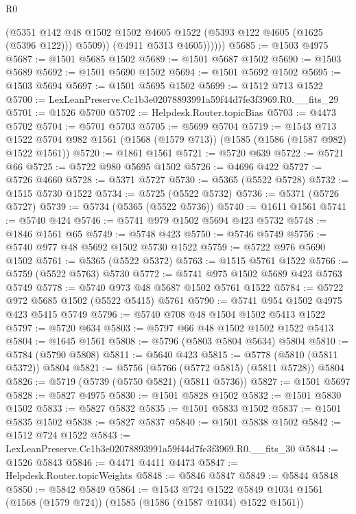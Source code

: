 \begin{lexlean}{R0}
\begin{coremodule}
                (@5351
                  @142
                  @48
                  @1502
                  @1502
                  @4605
                  @1522
                  (@5393 @122 @4605 (@1625 (@5396 @122)))
                  @5509))
              (@4911 @5313 @4605))))))
@5685 := @1503 @4975
@5687 := @1501 @5685 @1502
@5689 := @1501 @5687 @1502
@5690 := @1503 @5689
@5692 := @1501 @5690 @1502
@5694 := @1501 @5692 @1502
@5695 := @1503 @5694
@5697 := @1501 @5695 @1502
@5699 := @1512 @713 @1522
@5700 := LexLeanPreserve.Cc1b3e02078893991a59f44d7fe3f3969.R0.__fits_29
@5701 := @1526 @5700
@5702 := Helpdesk.Router.topicBias
@5703 := @4473 @5702
@5704 := @5701 @5703
@5705 := @5699 @5704
@5719 := @1543
    @713
    @1522
    @5704
    @982
    @1561
    (@1568 (@1579 @713))
    (@1585 (@1586 (@1587 @982) @1522 @1561))
@5720 := @1861 @1561
@5721 := @5720 @639
@5722 := @5721 @66
@5725 := @5722 @980 @5695 @1502
@5726 := @4696 @422
@5727 := @5726 @4660
@5728 := @5371 @5727
@5730 := @5365 (@5522 @5728)
@5732 := @1515 @5730 @1522
@5734 := @5725 (@5522 @5732)
@5736 := @5371 (@5726 @5727)
@5739 := @5734 (@5365 (@5522 @5736))
@5740 := @1611 @1561
@5741 := @5740 @424
@5746 := @5741 @979 @1502 @5694 @423 @5732
@5748 := @1846 @1561 @65
@5749 := @5748 @423
@5750 := @5746 @5749
@5756 := @5740 @977 @48 @5692 @1502 @5730 @1522
@5759 := @5722 @976 @5690 @1502
@5761 := @5365 (@5522 @5372)
@5763 := @1515 @5761 @1522
@5766 := @5759 (@5522 @5763) @5730
@5772 := @5741 @975 @1502 @5689 @423 @5763 @5749
@5778 := @5740 @973 @48 @5687 @1502 @5761 @1522
@5784 := @5722 @972 @5685 @1502 (@5522 @5415) @5761
@5790 := @5741 @954 @1502 @4975 @423 @5415 @5749
@5796 := @5740 @708 @48 @1504 @1502 @5413 @1522
@5797 := @5720 @634
@5803 := @5797 @66 @48 @1502 @1502 @1522 @5413
@5804 := @1645 @1561
@5808 := @5796 (@5803 @5804 @5634) @5804
@5810 := @5784 (@5790 @5808)
@5811 := @5640 @423
@5815 := @5778 (@5810 (@5811 @5372)) @5804
@5821 := @5756 (@5766 (@5772 @5815) (@5811 @5728)) @5804
@5826 := @5719 (@5739 (@5750 @5821) (@5811 @5736))
@5827 := @1501 @5697
@5828 := @5827 @4975
@5830 := @1501 @5828 @1502
@5832 := @1501 @5830 @1502
@5833 := @5827 @5832
@5835 := @1501 @5833 @1502
@5837 := @1501 @5835 @1502
@5838 := @5827 @5837
@5840 := @1501 @5838 @1502
@5842 := @1512 @724 @1522
@5843 := LexLeanPreserve.Cc1b3e02078893991a59f44d7fe3f3969.R0.__fits_30
@5844 := @1526 @5843
@5846 := @4471 @4411 @4473
@5847 := Helpdesk.Router.topicWeights
@5848 := @5846 @5847
@5849 := @5844 @5848
@5850 := @5842 @5849
@5864 := @1543
    @724
    @1522
    @5849
    @1034
    @1561
    (@1568 (@1579 @724))
    (@1585 (@1586 (@1587 @1034) @1522 @1561))

\end{coremodule}
\end{lexlean}
